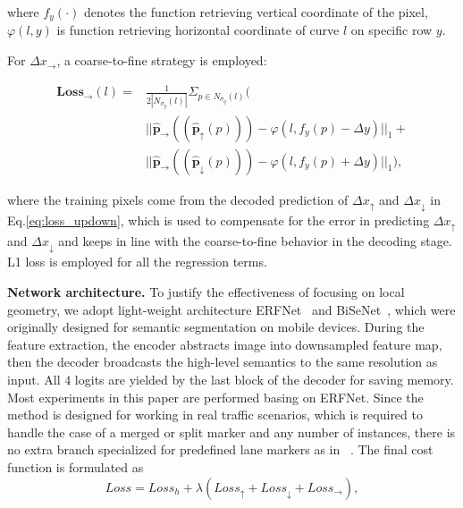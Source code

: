 \documentclass[final]{cvpr}
\begin{document}
\noindent where $f_{y}(\cdot)$ denotes the function retrieving vertical coordinate of the pixel, $\varphi(l,y)$ is function retrieving horizontal coordinate of curve $l$ on specific row $y$.


For $\Delta{x_{\rightarrow}}$, a coarse-to-fine strategy is employed:

\begin{equation}
	\begin{aligned}
		\bm{Loss_{\rightarrow}}(l)= & \frac{1}{2|N_{\sigma_{g}}(l)|}\Sigma_{p\in{N_{\sigma_{g}}(l)}}( \\
		&||\bm{\hat{p}}_{\rightarrow}((\bm{\hat{p}}_{\uparrow}(p))) -  \varphi(l,f_{y}(p)-\Delta y)||_{1}  + \\
		&||\bm{\hat{p}}_{\rightarrow}((\bm{\hat{p}}_{\downarrow}(p))) -  \varphi(l,f_{y}(p)+\Delta y)||_{1}),
	\end{aligned}
	\label{eq:loss_same}
\end{equation}

\noindent where the training pixels come from the decoded prediction of $\Delta{x_{\uparrow}}$ and $\Delta{x_{\downarrow}}$ in Eq.\ref{eq:loss_updown}, which is used to compensate for the error in predicting $\Delta{x_{\uparrow}}$ and $\Delta{x_{\downarrow}}$ and keeps in line with the coarse-to-fine behavior in the decoding stage. L1 loss is employed for all the regression terms.


\textbf{Network architecture.} To justify the effectiveness of focusing on local geometry, we adopt light-weight architecture ERFNet~\cite{romera2017erfnet} and BiSeNet~\cite{yu2018bisenet}, which were originally designed for semantic segmentation on mobile devices. During the feature extraction, the encoder abstracts image into downsampled feature map, then the decoder broadcasts the high-level semantics to the same resolution as input. All 4 logits are yielded by the last block of the decoder for saving memory. Most experiments in this paper are performed basing on ERFNet. Since the method is designed for working in real traffic scenarios, which is required to handle the case of a merged or split marker and any number of instances, there is no extra branch specialized for predefined lane markers as in ~\cite{pan2017spatial,hou2019learning}. The final cost function is formulated as
\begin{equation}
	Loss = Loss_{h} + \lambda(Loss_{\uparrow}+Loss_{\downarrow}+Loss_{\rightarrow}),
	\label{eq:final_loss}
\end{equation}
\end{document}
